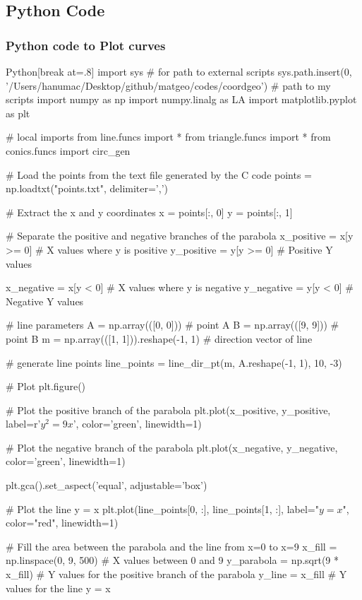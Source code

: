 \documentclass{beamer}
\theoremstyle{remark}
\numberwithin{equation}{section}
\begin{document}
\subsection{Python Code}
\begin{frame}
  \frametitle{Python code to Plot curves}
  \begin{mintedbox}{Python}[break at=.8\textheight]
import sys  # for path to external scripts
sys.path.insert(0, '/Users/hanumac/Desktop/github/matgeo/codes/coordgeo')  # path to my scripts
import numpy as np
import numpy.linalg as LA
import matplotlib.pyplot as plt

# local imports
from line.funcs import *
from triangle.funcs import *
from conics.funcs import circ_gen

# Load the points from the text file generated by the C code
points = np.loadtxt("points.txt", delimiter=',')

# Extract the x and y coordinates
x = points[:, 0]
y = points[:, 1]

# Separate the positive and negative branches of the parabola
x_positive = x[y >= 0]  # X values where y is positive
y_positive = y[y >= 0]  # Positive Y values

x_negative = x[y < 0]   # X values where y is negative
y_negative = y[y < 0]   # Negative Y values

# line parameters
A = np.array(([0, 0]))  # point A
B = np.array(([9, 9]))  # point B
m = np.array(([1, 1])).reshape(-1, 1)  # direction vector of line

# generate line points
line_points = line_dir_pt(m, A.reshape(-1, 1), 10, -3)

# Plot
plt.figure()

# Plot the positive branch of the parabola
plt.plot(x_positive, y_positive, label=r'$y^2 = 9x$', color='green', linewidth=1)

# Plot the negative branch of the parabola
plt.plot(x_negative, y_negative, color='green', linewidth=1)

plt.gca().set_aspect('equal', adjustable='box')

# Plot the line y = x
plt.plot(line_points[0, :], line_points[1, :], label="$ y = x $", color="red", linewidth=1)

# Fill the area between the parabola and the line from x=0 to x=9
x_fill = np.linspace(0, 9, 500)  # X values between 0 and 9
y_parabola = np.sqrt(9 * x_fill)  # Y values for the positive branch of the parabola
y_line = x_fill  # Y values for the line y = x


\end{mintedbox}
\end{frame}
\end{document}
